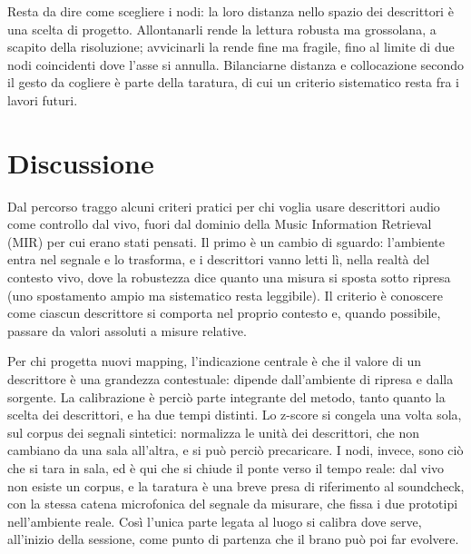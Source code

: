 \documentclass{article}
\begin{document}
Resta da dire come scegliere i nodi: la loro distanza nello spazio dei descrittori è una scelta di progetto. Allontanarli rende la lettura robusta ma grossolana, a scapito della risoluzione; avvicinarli la rende fine ma fragile, fino al limite di due nodi coincidenti dove l'asse si annulla. Bilanciarne distanza e collocazione secondo il gesto da cogliere è parte della taratura, di cui un criterio sistematico resta fra i lavori futuri.

\section{Discussione}\label{sec:discussione}

Dal percorso traggo alcuni criteri pratici per chi voglia usare descrittori audio come controllo dal vivo, fuori dal dominio della Music Information Retrieval (MIR) per cui erano stati pensati. Il primo è un cambio di sguardo: l'ambiente entra nel segnale e lo trasforma, e i descrittori vanno letti lì, nella realtà del contesto vivo, dove la robustezza dice quanto una misura si sposta sotto ripresa (uno spostamento ampio ma sistematico resta leggibile). Il criterio è conoscere come ciascun descrittore si comporta nel proprio contesto e, quando possibile, passare da valori assoluti a misure relative.

Per chi progetta nuovi mapping, l'indicazione centrale è che il valore di un descrittore è una grandezza contestuale: dipende dall'ambiente di ripresa e dalla sorgente. La calibrazione è perciò parte integrante del metodo, tanto quanto la scelta dei descrittori, e ha due tempi distinti. Lo z-score si congela una volta sola, sul corpus dei segnali sintetici: normalizza le unità dei descrittori, che non cambiano da una sala all'altra, e si può perciò precaricare. I nodi, invece, sono ciò che si tara in sala, ed è qui che si chiude il ponte verso il tempo reale: dal vivo non esiste un corpus, e la taratura è una breve presa di riferimento al soundcheck, con la stessa catena microfonica del segnale da misurare, che fissa i due prototipi nell'ambiente reale. Così l'unica parte legata al luogo si calibra dove serve, all'inizio della sessione, come punto di partenza che il brano può poi far evolvere.
\end{document}
